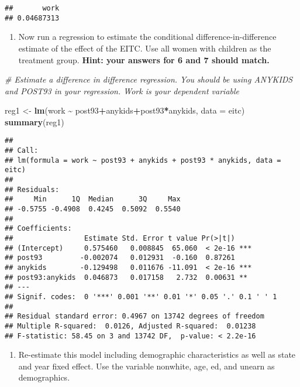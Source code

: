 \documentclass[
]{article}
\newenvironment{Shaded}{\begin{snugshade}}{\end{snugshade}}
\newcommand{\AttributeTok}[1]{\textcolor[rgb]{0.13,0.29,0.53}{#1}}
\newcommand{\CommentTok}[1]{\textcolor[rgb]{0.56,0.35,0.01}{\textit{#1}}}
\newcommand{\FunctionTok}[1]{\textcolor[rgb]{0.13,0.29,0.53}{\textbf{#1}}}
\newcommand{\NormalTok}[1]{#1}
\newcommand{\OtherTok}[1]{\textcolor[rgb]{0.56,0.35,0.01}{#1}}
\newcommand{\SpecialCharTok}[1]{\textcolor[rgb]{0.81,0.36,0.00}{\textbf{#1}}}
\providecommand{\tightlist}{%
  \setlength{\itemsep}{0pt}\setlength{\parskip}{0pt}}
\begin{document}
\begin{verbatim}
##       work 
## 0.04687313
\end{verbatim}

\begin{enumerate}
\def\labelenumi{\arabic{enumi}.}
\setcounter{enumi}{6}
\tightlist
\item
  Now run a regression to estimate the conditional
  difference-in-difference estimate of the effect of the EITC. Use all
  women with children as the treatment group. \textbf{Hint: your answers
  for 6 and 7 should match.}
\end{enumerate}

\begin{Shaded}
\begin{Highlighting}[]
\CommentTok{\# Estimate a difference in difference regression. You should be using ANYKIDS and POST93 in your regression. Work is your dependent variable}

\NormalTok{reg1 }\OtherTok{\textless{}{-}} \FunctionTok{lm}\NormalTok{(work }\SpecialCharTok{\textasciitilde{}}\NormalTok{ post93}\SpecialCharTok{+}\NormalTok{anykids}\SpecialCharTok{+}\NormalTok{post93}\SpecialCharTok{*}\NormalTok{anykids, }\AttributeTok{data =}\NormalTok{ eitc)}
\FunctionTok{summary}\NormalTok{(reg1)}
\end{Highlighting}
\end{Shaded}

\begin{verbatim}
## 
## Call:
## lm(formula = work ~ post93 + anykids + post93 * anykids, data = eitc)
## 
## Residuals:
##     Min      1Q  Median      3Q     Max 
## -0.5755 -0.4908  0.4245  0.5092  0.5540 
## 
## Coefficients:
##                 Estimate Std. Error t value Pr(>|t|)    
## (Intercept)     0.575460   0.008845  65.060  < 2e-16 ***
## post93         -0.002074   0.012931  -0.160  0.87261    
## anykids        -0.129498   0.011676 -11.091  < 2e-16 ***
## post93:anykids  0.046873   0.017158   2.732  0.00631 ** 
## ---
## Signif. codes:  0 '***' 0.001 '**' 0.01 '*' 0.05 '.' 0.1 ' ' 1
## 
## Residual standard error: 0.4967 on 13742 degrees of freedom
## Multiple R-squared:  0.0126, Adjusted R-squared:  0.01238 
## F-statistic: 58.45 on 3 and 13742 DF,  p-value: < 2.2e-16
\end{verbatim}

\begin{enumerate}
\def\labelenumi{\arabic{enumi}.}
\setcounter{enumi}{7}
\tightlist
\item
  Re-estimate this model including demographic characteristics as well
  as state and year fixed effect. Use the variable nonwhite, age, ed,
  and unearn as demographics.
\end{enumerate}
\end{document}

